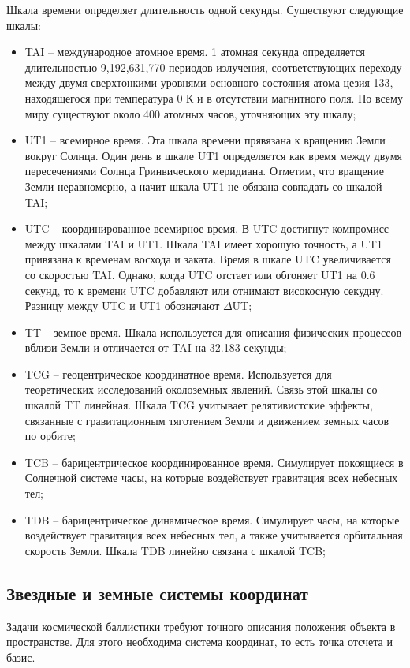 Шкала времени определяет длительность одной секунды. Существуют следующие шкалы:
\begin{itemize}
    \item TAI -- международное атомное время.
    1 атомная секунда определяется длительностью 9,192,631,770 периодов излучения, 
    соответствующих переходу между двумя сверхтонкими уровнями основного состояния
    атома цезия-133, находящегося при температура 0 К и в отсутствии магнитного поля.
    По всему миру существуют около 400 атомных часов, уточняющих эту шкалу;
    \item UT1 -- всемирное время.  Эта шкала времени прявязана к вращению Земли вокруг Солнца.
    Один день в шкале UT1 определяется как время между двумя пересечениями
    Солнца Гринвического меридиана.
    Отметим, что вращение Земли неравномерно, а начит шкала UT1 не обязана
    совпадать со шкалой TAI;
    \item UTC -- координированное всемирное время. 
    В UTC достигнут компромисс между шкалами TAI и UT1. Шкала TAI имеет
    хорошую точность, а UT1 привязана к временам восхода и заката. 
    Время в шкале UTC увеличивается со скоростью TAI. Однако, когда UTC отстает
    или обгоняет UT1 на 0.6 секунд, то к времени UTC добавляют или отнимают
    високосную секудну. Разницу между UTC и UT1 обозначают $\Delta$UT;
    \item TT -- земное время. Шкала используется для описания
    физических процессов вблизи Земли и отличается от TAI на 32.183 секунды;
    \item TCG -- геоцентрическое координатное время. Используется для теоретических
    исследований околоземных явлений. Связь этой шкалы со шкалой TT линейная.
    Шкала TCG учитывает релятивистские эффекты, связанные с гравитационным
    тяготением Земли и движением земных часов по орбите;
    \item TCB -- барицентрическое координированное время. Симулирует покоящиеся в Солнечной
    системе часы, на которые воздействует гравитация всех небесных тел;
    \item TDB -- барицентрическое динамическое время. Симулирует часы, на которые
    воздействует гравитация всех небесных тел, а также учитывается орбитальная
    скорость Земли. Шкала TDB линейно связана с шкалой TCB;
\end{itemize}

\subsection{Звездные и земные системы координат}
Задачи космической баллистики требуют точного описания положения объекта в пространстве.
Для этого необходима система координат, то есть точка отсчета и базис.

